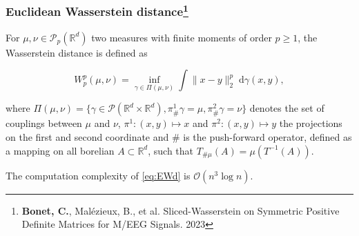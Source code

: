 \documentclass{beamer}
\begin{document}
\begin{frame}
\frametitle{Euclidean Wasserstein distance\footnote{\tiny{\textbf{Bonet, C.}, Malézieux, B., et al. Sliced-Wasserstein on Symmetric Positive Definite Matrices for M/EEG Signals. 2023}}}
For $\mu, \nu \in \mathcal{P}_p(\mathbb{R}^d)$ two measures with finite moments of order $p \ge 1$, the Wasserstein distance is defined as

\begin{equation}
W_p^p(\mu, \nu) = \inf_{\gamma \in \Pi(\mu, \nu)} \int \lVert x - y \rVert^p_2\; \mathrm{d} \gamma(x, y),
\label{eq:EWd}
\end{equation}

where $\Pi(\mu, \nu) = \{\gamma \in \mathcal{P}(\mathbb{R}^d \times \mathbb{R}^d), \pi_{\#}^1 \gamma = \mu, \pi_{\#}^2 \gamma = \nu\}$ denotes the set of couplings between $\mu$ and $\nu$, $\pi^1 \colon (x, y) \mapsto x$ and $\pi^2 \colon (x, y) \mapsto y$ the projections on the first and
second coordinate and $\#$ is the push-forward operator, defined as a mapping on all borelian $A \subset \mathbb{R}^d$, such that $T_{\# \mu}(A) = \mu(T^{-1}(A))$.

The computation complexity of \eqref{eq:EWd} is $\mathcal{O}(n^3 \log n)$.
\end{frame}

\end{document}

